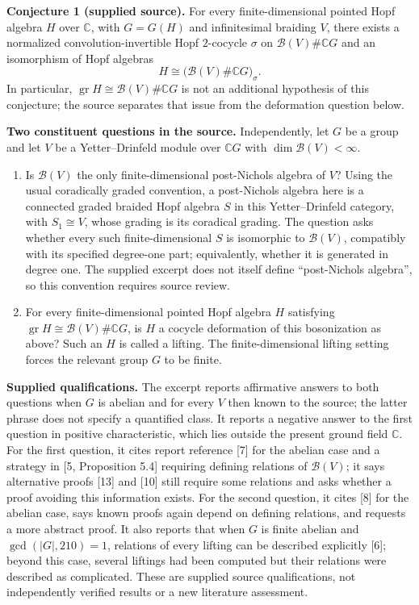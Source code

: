 \documentclass[11pt]{article}
\newcommand{\C}{\mathbb{C}}
\begin{document}
\textbf{Conjecture 1 (supplied source).} For every finite-dimensional pointed Hopf algebra \(H\) over \(\C\), with \(G=G(H)\) and infinitesimal braiding \(V\), there exists a normalized convolution-invertible Hopf \(2\)-cocycle \(\sigma\) on \(\mathcal B(V)\#\C G\) and an isomorphism of Hopf algebras
\[
H\cong\bigl(\mathcal B(V)\#\C G\bigr)_\sigma.
\]
In particular, \(\operatorname{gr}H\cong\mathcal B(V)\#\C G\) is not an additional hypothesis of this conjecture; the source separates that issue from the deformation question below.

\textbf{Two constituent questions in the source.} Independently, let \(G\) be a group and let \(V\) be a Yetter--Drinfeld module over \(\C G\) with \(\dim\mathcal B(V)<\infty\).
\begin{enumerate}
\item Is \(\mathcal B(V)\) the only finite-dimensional post-Nichols algebra of \(V\)? Using the usual coradically graded convention, a post-Nichols algebra here is a connected graded braided Hopf algebra \(S\) in this Yetter--Drinfeld category, with \(S_1\cong V\), whose grading is its coradical grading. The question asks whether every such finite-dimensional \(S\) is isomorphic to \(\mathcal B(V)\), compatibly with its specified degree-one part; equivalently, whether it is generated in degree one. The supplied excerpt does not itself define ``post-Nichols algebra'', so this convention requires source review.
\item For every finite-dimensional pointed Hopf algebra \(H\) satisfying \(\operatorname{gr}H\cong\mathcal B(V)\#\C G\), is \(H\) a cocycle deformation of this bosonization as above? Such an \(H\) is called a lifting. The finite-dimensional lifting setting forces the relevant group \(G\) to be finite.
\end{enumerate}

\textbf{Supplied qualifications.} The excerpt reports affirmative answers to both questions when \(G\) is abelian and for every \(V\) then known to the source; the latter phrase does not specify a quantified class. It reports a negative answer to the first question in positive characteristic, which lies outside the present ground field \(\C\). For the first question, it cites report reference [7] for the abelian case and a strategy in [5, Proposition 5.4] requiring defining relations of \(\mathcal B(V)\); it says alternative proofs [13] and [10] still require some relations and asks whether a proof avoiding this information exists. For the second question, it cites [8] for the abelian case, says known proofs again depend on defining relations, and requests a more abstract proof. It also reports that when \(G\) is finite abelian and \(\gcd(|G|,210)=1\), relations of every lifting can be described explicitly [6]; beyond this case, several liftings had been computed but their relations were described as complicated. These are supplied source qualifications, not independently verified results or a new literature assessment.
\end{document}
